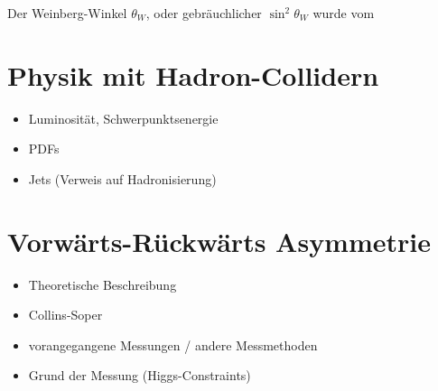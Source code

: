 Der Weinberg-Winkel $\theta_W$, oder gebräuchlicher $\sin^2\theta_W$ wurde vom





\section{Physik mit Hadron-Collidern}
\label{theory:hadron_collider}

\begin{itemize}
    \item Luminosität, Schwerpunktsenergie
    \item PDFs
    \item Jets (Verweis auf Hadronisierung)
\end{itemize}



\section{Vorwärts-Rückwärts Asymmetrie}
\label{theory:afb}

\begin{itemize}
    \item Theoretische Beschreibung
    \item Collins-Soper
    \item vorangegangene Messungen / andere Messmethoden
    \item Grund der Messung (Higgs-Constraints)
\end{itemize}



